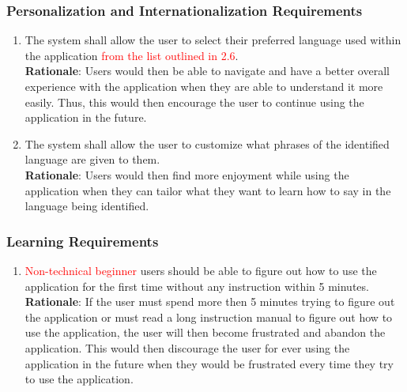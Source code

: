 \subsubsection{Personalization and Internationalization Requirements}
\label{ssub:personalization_and_internationalization_requirements}
\begin{enumerate}[{UH-PI}1. ]
	\item The system shall allow the user to select their preferred language used within the application \textcolor{red}{from the list outlined in 2.6}.
	\\ \textbf{Rationale}: Users would then be able to navigate and have a better overall experience with the application when they are able to understand it more easily. Thus, this would then encourage the user to continue using the application in the future.
	\item The system shall allow the user to customize what phrases of the identified language are given to them.
	\\ \textbf{Rationale}: Users would then find more enjoyment while using the application when they can tailor what they want to learn how to say in the language being identified.
\end{enumerate}


\subsubsection{Learning Requirements}
\label{ssub:learning_requirements}
\begin{enumerate}[{UH-L}1. ]
	\item \textcolor{red}{Non-technical beginner} users should be able to figure out how to use the application for the first time without any instruction within 5 minutes.
	\\ \textbf{Rationale}: If the user must spend more then 5 minutes trying to figure out the application or must read a long instruction manual to figure out how to use the application, the user will then become frustrated and abandon the application. This would then discourage the user for ever using the application in the future when they would be frustrated every time they try to use the application.	
\end{enumerate}

